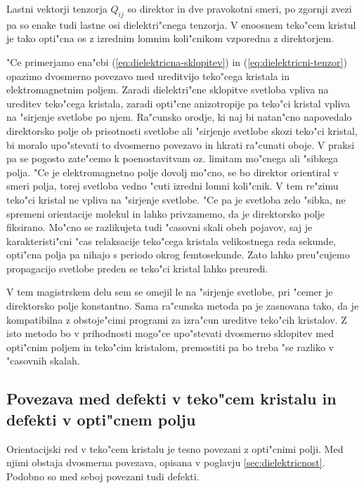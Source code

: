\documentclass[a4paper,10pt]{article}
\begin{document}
Lastni vektorji tenzorja $Q_{ij}$ so direktor in dve pravokotni smeri, po zgornji zvezi pa so enake tudi lastne osi dielektri"cnega tenzorja. 
V enoosnem teko"cem kristul je tako opti"cna os z izrednim lomnim koli"cnikom vzporedna z direktorjem. 

"Ce primerjamo ena"cbi (\ref{eq:dielektricna-sklopitev}) in (\ref{eq:dielektricni-tenzor}) opazimo dvosmerno povezavo med ureditvijo teko"cega kristala in elektromagnetnim poljem. 
Zaradi dielektri"cne sklopitve svetloba vpliva na ureditev teko"cega kristala, zaradi opti"cne anizotropije pa teko"ci kristal vpliva na "sirjenje svetlobe po njem. 
Ra"cunsko orodje, ki naj bi natan"cno napovedalo direktorsko polje ob prisotnosti svetlobe ali "sirjenje svetlobe skozi teko"ci kristal, bi moralo upo"stevati to dvosmerno povezavo in hkrati ra"cunati oboje. 
V praksi pa se pogosto zate"cemo k poenostavitvam oz. limitam mo"cnega ali "sibkega polja. 
"Ce je elektromagnetno polje dovolj mo"cno, se bo direktor orientiral v smeri polja, torej svetloba vedno "cuti izredni lomni koli"cnik. 
V tem re"zimu teko"ci kristal ne vpliva na "sirjenje svetlobe. 
"Ce pa je svetloba zelo "sibka, ne spremeni orientacije molekul in lahko privzamemo, da je direktorsko polje fiksirano. 
Mo"cno se razlikujeta tudi "casovni skali obeh pojavov, saj je karakteristi"cni "cas relaksacije teko"cega kristala velikostnega reda sekunde, opti"cna polja pa nihajo s periodo okrog femtosekunde. 
Zato lahko preu"cujemo propagacijo svetlobe preden se teko"ci kristal lahko preuredi. 

V tem magistrskem delu sem se omejil le na "sirjenje svetlobe, pri "cemer je direktorsko polje konstantno. 
Sama ra"cunska metoda pa je zasnovana tako, da je kompatibilna z obstoje"cimi programi za izra"cun ureditve teko"cih kristalov\cite{ravnik-zumer-ldg}. 
Z isto metodo bo v prihodnosti mogo"ce upo"stevati dvosmerno sklopitev med opti"cnim poljem in teko"cim kristalom, premostiti pa bo treba "se razliko v "casovnih skalah. 

\subsection{Povezava med defekti v teko"cem kristalu in defekti v opti"cnem polju}
Orientacijski red v teko"cem kristalu je tesno povezani z opti"cnimi polji. 
Med njimi obstaja dvosmerna povezava, opisana v poglavju \ref{sec:dielektricnost}. 
Podobno so med seboj povezani tudi defekti. 
\end{document}
